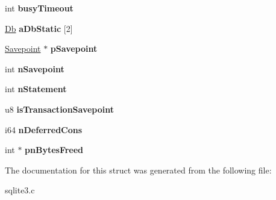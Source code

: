 \begin{DoxyCompactItemize}
\item 
\hypertarget{structsqlite3_a69237f7a2b079706c544f09255fd8905}{int {\bfseries busy\-Timeout}}\label{structsqlite3_a69237f7a2b079706c544f09255fd8905}

\item 
\hypertarget{structsqlite3_ad99069213dff7fede71447b97d22d710}{\hyperlink{struct_db}{Db} {\bfseries a\-Db\-Static} \mbox{[}2\mbox{]}}\label{structsqlite3_ad99069213dff7fede71447b97d22d710}

\item 
\hypertarget{structsqlite3_a47f4fe21bba981ccd47ee7f873f48a07}{\hyperlink{struct_savepoint}{Savepoint} $\ast$ {\bfseries p\-Savepoint}}\label{structsqlite3_a47f4fe21bba981ccd47ee7f873f48a07}

\item 
\hypertarget{structsqlite3_a51d1dc4f5668dbc2282162bdfdca96ec}{int {\bfseries n\-Savepoint}}\label{structsqlite3_a51d1dc4f5668dbc2282162bdfdca96ec}

\item 
\hypertarget{structsqlite3_a727c6da42aa4313c715de350303c90f6}{int {\bfseries n\-Statement}}\label{structsqlite3_a727c6da42aa4313c715de350303c90f6}

\item 
\hypertarget{structsqlite3_acaca2a1d41db7b83a0fe8a477bd22d1d}{u8 {\bfseries is\-Transaction\-Savepoint}}\label{structsqlite3_acaca2a1d41db7b83a0fe8a477bd22d1d}

\item 
\hypertarget{structsqlite3_a1d74627daa6fe93811e99cffe9362c10}{i64 {\bfseries n\-Deferred\-Cons}}\label{structsqlite3_a1d74627daa6fe93811e99cffe9362c10}

\item 
\hypertarget{structsqlite3_a5559fb199b06ee59b635bb18f153fcf8}{int $\ast$ {\bfseries pn\-Bytes\-Freed}}\label{structsqlite3_a5559fb199b06ee59b635bb18f153fcf8}

\end{DoxyCompactItemize}


The documentation for this struct was generated from the following file\-:\begin{DoxyCompactItemize}
\item 
sqlite3.\-c\end{DoxyCompactItemize}
